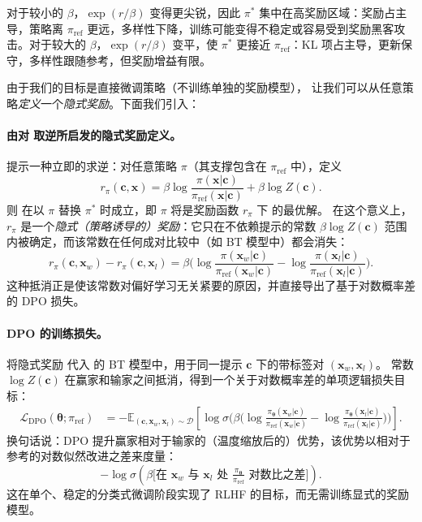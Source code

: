 对于较小的 $\beta$，$\exp(r/\beta)$ 变得更尖锐，因此 $\pi^*$ 集中在高奖励区域：奖励占主导，策略离 $\pi_{\mathrm{ref}}$ 更远，多样性下降，训练可能变得不稳定或容易受到奖励黑客攻击。对于较大的 $\beta$，$\exp(r/\beta)$ 变平，使 $\pi^*$ 更接近 $\pi_{\mathrm{ref}}$：KL 项占主导，更新保守，多样性跟随参考，但奖励增益有限。

由于我们的目标是直接微调策略（不训练单独的奖励模型）， 让我们可以从任意策略\emph{定义}一个\textit{隐式奖励}。下面我们引入：
\paragraph{由对  取逆所启发的隐式奖励定义。}
 提示一种立即的求逆：对任意策略 $\pi$（其支撑包含在 $\pi_{\mathrm{ref}}$ 中），定义
\begin{equation}\label{eq:implicit-reward}
r_{\pi}(\mathbf c,\mathbf x)
 =
\beta \log\frac{\pi(\mathbf x|\mathbf c)}{\pi_{\mathrm{ref}}(\mathbf x|\mathbf c)}
 + \beta \log Z(\mathbf c).
\end{equation}
则  在以 $\pi$ 替换 $\pi^*$ 时成立，即 $\pi$ 将是奖励函数 $r_{\pi}$ 下  的最优解。
在这个意义上，$r_{\pi}$ 是一个\emph{隐式（策略诱导的）奖励}：它只在不依赖提示的常数 $\beta\log Z(\mathbf c)$ 范围内被确定，而该常数在任何成对比较中（如 BT 模型中）都会消失：
\[
r_{\pi}(\mathbf c,\mathbf x_w)-r_{\pi}(\mathbf c,\mathbf x_l)
=
\beta\Big(
\log\frac{\pi(\mathbf x_w|\mathbf c)}{\pi_{\mathrm{ref}}(\mathbf x_w|\mathbf c)}
-
\log\frac{\pi(\mathbf x_l|\mathbf c)}{\pi_{\mathrm{ref}}(\mathbf x_l|\mathbf c)}
\Big).
\]
这种抵消正是使该常数对偏好学习无关紧要的原因，并直接导出了基于对数概率差的 DPO 损失。

\paragraph{DPO 的训练损失。}
将隐式奖励  代入  的 BT 模型中，用于同一提示 $\mathbf c$ 下的带标签对 $(\mathbf x_w,\mathbf x_l)$。
常数 $\log Z(\mathbf c)$ 在赢家和输家之间抵消，得到一个关于对数概率差的单项逻辑损失目标：
\begin{align*}
\mathcal L_{\mathrm{DPO}}(\bm\theta;\pi_{\mathrm{ref}})
&=
-\mathbb E_{(\mathbf c,\mathbf x_w,\mathbf x_l)\sim\mathcal D} \left[
\log \sigma \Big(
\beta\big(
\log\frac{\pi_{\bm\theta}(\mathbf x_w|\mathbf c)}{\pi_{\mathrm{ref}}(\mathbf x_w|\mathbf c)}
-
\log\frac{\pi_{\bm\theta}(\mathbf x_l|\mathbf c)}{\pi_{\mathrm{ref}}(\mathbf x_l|\mathbf c)}
\big)
\Big)
\right].
\end{align*}
换句话说：DPO 提升赢家相对于输家的（温度缩放后的）优势，该优势以相对于参考的对数似然改进之差来度量：
\[
-\log \sigma \left(
  \beta
  \bigl[
    \text{在 } \mathbf x_w \text{ 与 } \mathbf x_l \text{ 处 }
    \tfrac{\pi_{\bm\theta}}{\pi_{\mathrm{ref}}}
    \text{ 对数比之差}
  \bigr]
\right).
\]
这在单个、稳定的分类式微调阶段实现了 RLHF 的目标，而无需训练显式的奖励模型。


